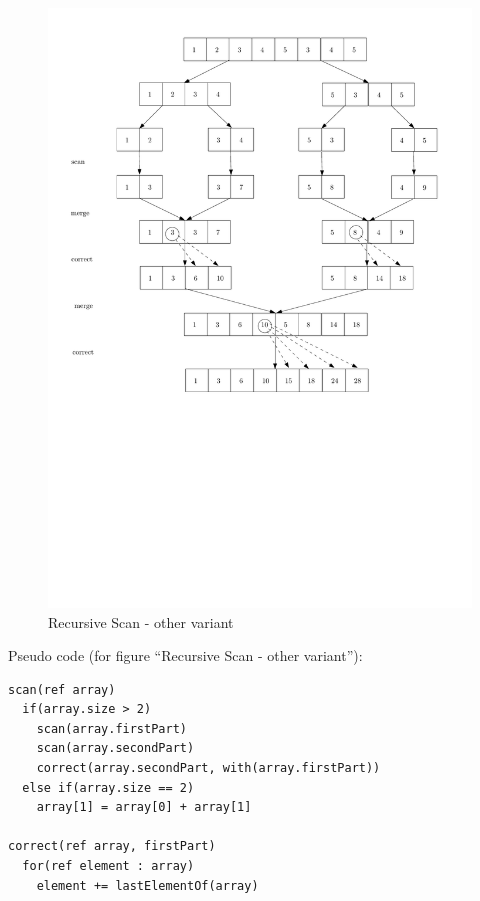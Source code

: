 \documentclass[a4paper,twoside,11pt]{article}
\begin{document}
\begin{figure}[hbtp]
\centering
\label{fig:para_algo}
\includegraphics[scale=.75]{recur3}
\caption{Recursive Scan - other variant}
\end{figure}

Pseudo code (for figure "`Recursive Scan - other variant"'):
\begin{verbatim}
scan(ref array)
  if(array.size > 2)
    scan(array.firstPart)
    scan(array.secondPart)
    correct(array.secondPart, with(array.firstPart))
  else if(array.size == 2)
    array[1] = array[0] + array[1]
	
correct(ref array, firstPart)
  for(ref element : array)
    element += lastElementOf(array)
\end{verbatim}
\end{document}
